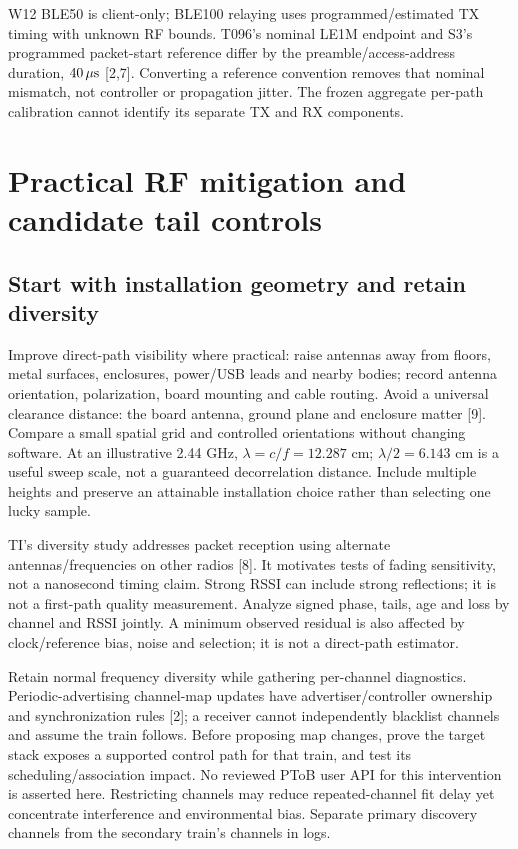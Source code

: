 \documentclass[11pt,letterpaper]{article}
\begin{document}
W12 BLE50 is client-only; BLE100 relaying uses programmed/estimated TX timing with unknown RF bounds. T096's nominal LE1M endpoint and S3's programmed packet-start reference differ by the preamble/access-address duration, $40\,\mu\mathrm{s}$ [2,7]. Converting a reference convention removes that nominal mismatch, not controller or propagation jitter. The frozen aggregate per-path calibration cannot identify its separate TX and RX components.
\newpage
\section{Practical RF mitigation and candidate tail controls}
\subsection{Start with installation geometry and retain diversity}
Improve direct-path visibility where practical: raise antennas away from floors, metal surfaces, enclosures, power/USB leads and nearby bodies; record antenna orientation, polarization, board mounting and cable routing. Avoid a universal clearance distance: the board antenna, ground plane and enclosure matter [9]. Compare a small spatial grid and controlled orientations without changing software. At an illustrative 2.44 GHz, $\lambda=c/f=12.287$ cm; $\lambda/2=6.143$ cm is a useful sweep scale, not a guaranteed decorrelation distance. Include multiple heights and preserve an attainable installation choice rather than selecting one lucky sample.

TI's diversity study addresses packet reception using alternate antennas/frequencies on other radios [8]. It motivates tests of fading sensitivity, not a nanosecond timing claim. Strong RSSI can include strong reflections; it is not a first-path quality measurement. Analyze signed phase, tails, age and loss by channel and RSSI jointly. A minimum observed residual is also affected by clock/reference bias, noise and selection; it is not a direct-path estimator.

Retain normal frequency diversity while gathering per-channel diagnostics. Periodic-advertising channel-map updates have advertiser/controller ownership and synchronization rules [2]; a receiver cannot independently blacklist channels and assume the train follows. Before proposing map changes, prove the target stack exposes a supported control path for that train, and test its scheduling/association impact. No reviewed PToB user API for this intervention is asserted here. Restricting channels may reduce repeated-channel fit delay yet concentrate interference and environmental bias. Separate primary discovery channels from the secondary train's channels in logs.
\end{document}
